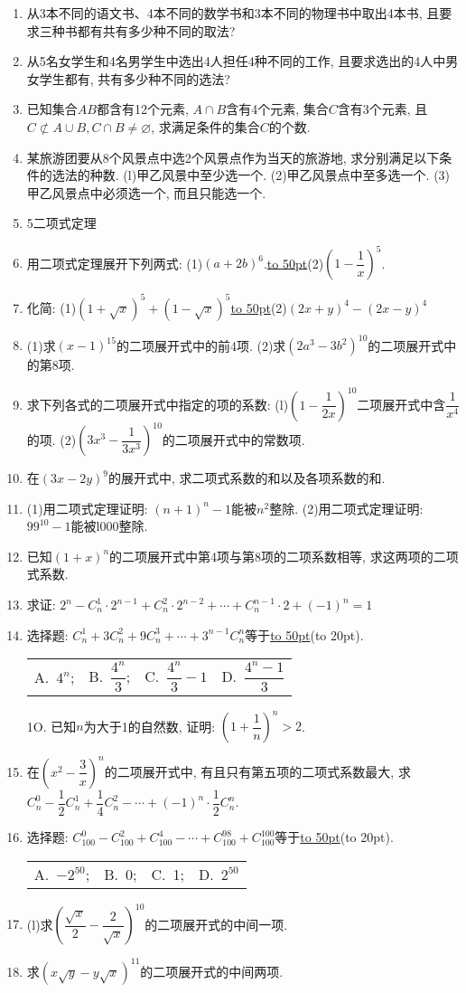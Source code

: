 \documentclass[10pt,a4paper]{article}
\newcommand{\blank}[1]{\underline{\hbox to #1pt{}}}
\newcommand{\bracket}[1]{(\hbox to #1pt{})}
\newcommand{\fourch}[4]{\par\begin{tabular}{p{.23\textwidth}p{.23\textwidth}p{.23\textwidth}p{.23\textwidth}}
A.~#1 &B.~#2& C.~#3& D.~#4
\end{tabular}}
\begin{document}
\begin{enumerate}[1.]
\item 从3本不同的语文书、4本不同的数学书和3本不同的物理书中取出4本书, 且要求三种书都有共有多少种不同的取法?
\item 从5名女学生和4名男学生中选出4人担任4种不同的工作, 且要求选出的4人中男女学生都有, 共有多少种不同的选法?
\item 已知集合$AB$都含有12个元素, $A\cap B$含有4个元素, 集合$C$含有3个元素, 且$C\not \subset A\cup B,C\cap B\ne \varnothing$, 求满足条件的集合$C$的个数.
\item 某旅游团要从8个风景点中选2个风景点作为当天的旅游地, 求分别满足以下条件的选法的种数.
(l)甲乙风景中至少选一个.
(2)甲乙风景点中至多选一个.
(3)甲乙风景点中必须选一个, 而且只能选一个.
\item 5二项式定理
\item 用二项式定理展开下列两式:
(1)$(a+2b)^6$.\blank{50}(2)$(1-\dfrac 1x)^5$.
\item 化简:
(1)$(1+\sqrt x)^5+(1-\sqrt x)^5$\blank{50}(2)$(2x+y)^4-(2x-y)^4$
\item (1)求$(x-1)^{15}$的二项展开式中的前4项.
(2)求$(2a^3-3b^2)^{10}$的二项展开式中的第8项.
\item 求下列各式的二项展开式中指定的项的系数:
(l)$(1-\dfrac 1{2x})^{10}$二项展开式中含$\dfrac 1{x^4}$的项.
(2)$(3x^3-\dfrac 1{3x^3})^{10}$的二项展开式中的常数项.
\item 在$(3x-2y)^9$的展开式中, 求二项式系数的和以及各项系数的和.
\item (1)用二项式定理证明: $(n+1)^n-1$能被$n^2$整除.
(2)用二项式定理证明: $99^{10}-1$能被l000整除.
\item 已知$(1+x)^n$的二项展开式中第4项与第8项的二项系数相等, 求这两项的二项式系数.
\item 求证: $2^n-C_n^1\cdot 2^{n-1}+C_n^2\cdot 2^{n-2}+\cdots +C_n^{n-1}\cdot 2+(-1)^n=1$
\item 选择题:
$C_n^1+3C_n^2+9C_n^3+\cdots +3^{n-1}C_n^n$等于\blank{50}\bracket{20}.
\fourch{$4^n$;}{$\dfrac{4^n}3$;}{$\dfrac{4^n}3-1$}{$\dfrac{4^n-1}3$}
1O. 已知$n$为大于1的自然数, 证明: $(1+\dfrac 1n)^n>2$.
\item 在$(x^2-\dfrac 3x)^n$的二项展开式中, 有且只有第五项的二项式系数最大, 求$C_n^0-\dfrac 12C_n^1+\dfrac 14C_n^2-\cdots +(-1)^n\cdot \dfrac 12C_n^n$.
\item 选择题:
$C_{100}^0-C_{100}^2+C_{100}^4-\cdots +C_{100}^{98}+C_{100}^{100}$等于\blank{50}\bracket{20}.
\fourch{$-2^{50}$;}{0;}{1;}{$2^{50}$}
\item (l)求$(\dfrac{\sqrt x}2-\dfrac 2{\sqrt x})^{10}$的二项展开式的中间一项.
\item 求$(x\sqrt y-y\sqrt x)^{11}$的二项展开式的中间两项.

\end{enumerate}
\end{document}
